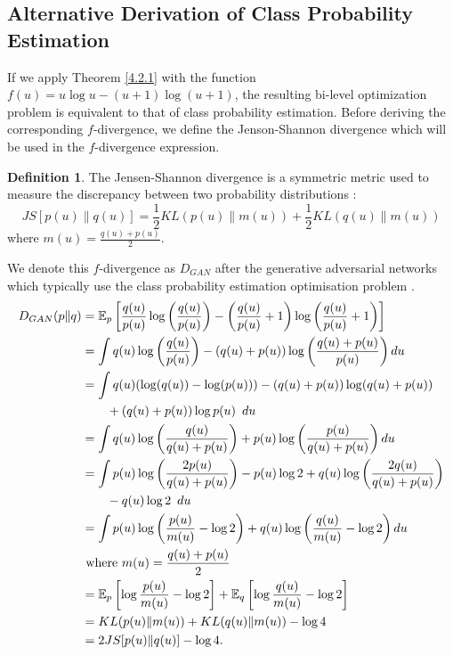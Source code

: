 \documentclass[honours,12pt]{unswthesis}
\newcommand{\E}{\mathbb{E}}
\numberwithin{equation}{section}
\theoremstyle{definition}
\newtheorem{definition}[theorem]{Definition}
\begin{document}
\subsection{Alternative Derivation of Class Probability Estimation}\label{sec:4.2.4}
If we apply Theorem \ref{4.2.1} with the function $f(u)=u\log u-(u+1)\log (u+1)$, the resulting bi-level optimization problem is equivalent to that of class probability estimation\citep{tiao}. Before deriving the corresponding $f$-divergence, we define the Jenson-Shannon divergence which will be used in the $f$-divergence expression.
\begin{definition}
The Jensen-Shannon divergence is a symmetric metric used to measure the discrepancy between two probability distributions \citep{JS}:
\[JS[p(u)\|q(u)]=\frac12 KL(p(u)\|m(u))+\frac12 KL(q(u)\|m(u))\]
where $m(u)=\frac{q(u)+p(u)}{2}$.
\end{definition}
We denote this $f$-divergence as $D_{GAN}$ after the generative adversarial networks which typically use the class probability estimation optimisation problem \citep{gan}.
\begin{align*}
D_{GAN}(p\|q)&= \E_p\left[\frac{q(u)}{p(u)}\log \left(\frac{q(u)}{p(u)}\right)-\left(\frac{q(u)}{p(u)}+1 \right)\log\left(\frac{q(u)}{p(u)}+1\right)\right]\\
&= \int q(u)\log\left(\frac{q(u)}{p(u)}\right)-(q(u)+p(u))\log\left(\frac{q(u)+p(u)}{p(u)}\right)du\\
&= \int q(u)(\log(q(u))-\log(p(u)))-(q(u)+p(u))\log(q(u)+p(u))\\
&\qquad +(q(u)+p(u))\log p(u)\enskip du\\
&= \int q(u)\log\left(\frac{q(u)}{q(u)+p(u)}\right)+p(u)\log \left(\frac{p(u)}{q(u)+p(u)}\right) du\\
&= \int p(u)\log \left(\frac{2p(u)}{q(u)+p(u)}\right)-p(u)\log 2+q(u)\log \left(\frac{2q(u)}{q(u)+p(u)}\right)\\
&\qquad -q(u)\log 2\enskip du\\
&= \int p(u)\log \left(\frac{p(u)}{m(u)}-\log 2\right)+q(u)\log \left(\frac{q(u)}{m(u)}-\log 2\right)du\\
&\text{ where }m(u)=\frac{q(u)+p(u)}{2}\\
&= \E_p \left[\log \frac{p(u)}{m(u)}-\log 2\right]+\E_q\left[\log\frac{q(u)}{m(u)}-\log 2\right]\\
&= KL(p(u)\|m(u))+KL(q(u)\|m(u))-\log 4\\
&= 2JS[p(u)\|q(u)]-\log 4.
\end{align*}
\end{document}
